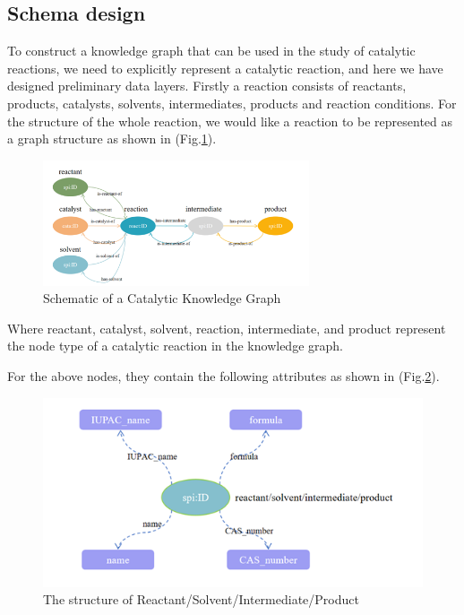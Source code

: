 \documentclass[%
 aip,
 jmp,%
 amsmath,amssymb,
 reprint,%
]{revtex4-2}
\begin{document}
\subsection{Schema design}
To construct a knowledge graph that can be used in the study of catalytic reactions, we need to explicitly represent a catalytic reaction, and here we have designed preliminary data layers.
Firstly a reaction consists of reactants, products, catalysts, solvents, intermediates, products and reaction conditions.
For the structure of the whole reaction, we would like a reaction to be represented as a graph structure as shown in (Fig.\ref{ Fig.13 }).
\begin{figure}[htbp]
 \centering
 \includegraphics[width=0.7\textwidth]{figure/13.png}
 \caption{ Schematic of a Catalytic Knowledge Graph }
 \label{ Fig.13 }
\end{figure}

Where reactant, catalyst, solvent, reaction, intermediate, and product represent the node type of a catalytic reaction in the knowledge graph.

For the above nodes, they contain the following attributes as shown in (Fig.\ref{ Fig.14 }).

\begin{figure}[htbp]
 \centering
 \includegraphics[width=1\textwidth]{figure/14.png}
 \caption{ The structure of Reactant/Solvent/Intermediate/Product }
 \label{ Fig.14 }
\end{figure}
\end{document}
